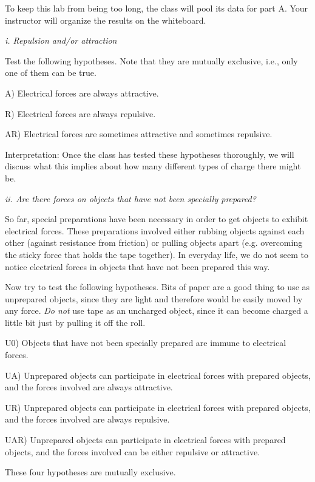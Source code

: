 To keep this lab from being too long, the class will pool its data
for part A. Your instructor will organize the results on the whiteboard.

\vfill

\emph{i. Repulsion and/or attraction}

Test the following hypotheses. Note that they are
mutually exclusive, i.e., only one of them can be true.

A) Electrical forces are always attractive.

R) Electrical forces are always repulsive.

AR) Electrical forces are sometimes attractive and
sometimes repulsive.

Interpretation: Once the class has tested these
hypotheses thoroughly, we will discuss what
this implies about how many different types of charge there might be.

\vfill

\emph{ii. Are there forces on objects that have not been specially prepared?}

So far, special preparations have been necessary in order to
get objects to exhibit electrical forces. These preparations
involved either rubbing objects against each other (against
resistance from friction) or pulling objects apart (e.g.
overcoming the sticky force that holds the tape together).
In everyday life, we do not seem to notice electrical forces
in objects that have not been prepared this way.

Now try to test the following hypotheses. Bits of paper are
a good thing to use as unprepared objects, since they are
light and therefore would be easily moved by any force.
\emph{Do not} use tape as an uncharged object, since it can
become charged a little bit just by pulling it off the roll.

U0) Objects that have not been specially prepared are immune
to electrical forces.

UA) Unprepared objects can participate in electrical forces
with prepared objects, and the forces involved are always attractive.

UR) Unprepared objects can participate in electrical forces
with prepared objects, and the forces involved are always repulsive.

UAR) Unprepared objects can participate in electrical forces
with prepared objects, and the forces involved can be either
repulsive or attractive.

These four hypotheses are mutually exclusive.

